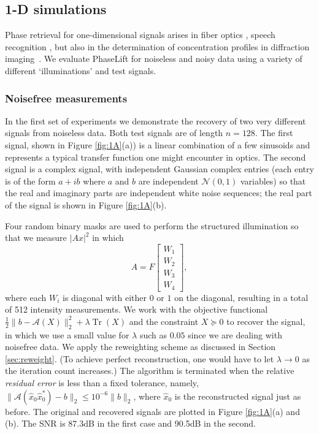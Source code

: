 \documentclass[11pt]{article}
\newcommand{\<}{\langle}
\renewcommand{\>}{\rangle}
\newcommand{\cA}{\mathcal{A}}
\newcommand{\trace}{\operatorname{Tr}}
\numberwithin{equation}{section}
\begin{document}
\subsection{1-D simulations}  \label{ss:num1d}


Phase retrieval for one-dimensional signals arises in fiber optics
\cite{CM97,YM99,ILB08}, speech recognition \cite{RJ93}, 
but also in the determination of concentration profiles in diffraction
imaging~\cite{Bun07}. We evaluate  %
PhaseLift for noiseless and
noisy data using a variety of different `illuminations' and test signals.

\subsubsection{Noisefree measurements} \label{sss:1dnoisefree}

In the first set of experiments we demonstrate the recovery of two very
different signals from noiseless data. Both test signals are of length
$n = 128$.  The first signal, shown in Figure \ref{fig:1A}(a)) is a
linear combination of a few sinusoids and represents a typical
transfer function one might encounter in optics. The second signal is
a complex signal, with independent Gaussian complex entries (each
entry is of the form $a + i b$ where $a$ and $b$ are independent
$\mathcal{N}(0,1)$ variables) so that the real and imaginary parts are
independent white noise sequences; the real part of the signal is
shown in Figure \ref{fig:1A}(b).

Four random binary masks are used to perform the structured
illumination so that we measure $|Ax|^2$ in which 
\[
A = F \begin{bmatrix} W_1 \\ W_2 \\ W_3 \\ W_4 \end{bmatrix}, 
\]
where each $W_i$ is diagonal with either $0$ or $1$ on the diagonal,
resulting in a total of 512 intensity measurements.  We work with the
objective functional $\frac12 \|b - \cA(X)\|_2^2 + \lambda \trace(X)$
and the constraint $X \succeq 0$ to recover the signal, in which we
use a small value for $\lambda$ such as $0.05$ since we are dealing
with noisefree data. We apply the reweighting scheme as discussed in
Section \ref{sec:reweight}.  (To achieve perfect reconstruction, one
would have to let $\lambda \to 0$ as the iteration count increases.)
The algorithm is terminated when the relative {\em residual error } is
less than a fixed tolerance, namely, $\|\cA(\hat{x}_0 \hat{x}_0^*) -
b\|_2 \le 10^{-6} \|b\|_2$, where $\hat{x}_0$ is the reconstructed
signal just as before.  The original and recovered signals are plotted
in Figure \ref{fig:1A}(a) and (b).  The SNR is 87.3dB in the first
case and 90.5dB in the second.
\end{document}
